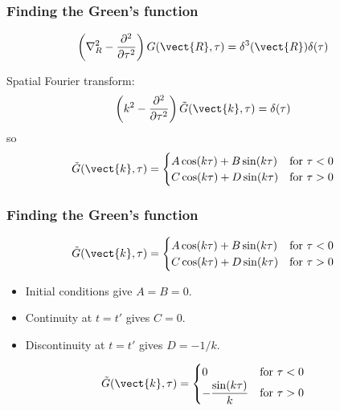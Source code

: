 \documentclass[12 pt, compress, handout, intlimits]{beamer}
\newcommand{\ft}[1]{\tilde{#1}}
\begin{document}
\begin{frame}[fragile]
    \frametitle{Finding the Green's function}
    
    \begin{align*}
        \left( \nabla_R^2 - \frac{\partial^2}{\partial \tau^2} \right) G(\vect{R}, \tau) &= \delta^3(\vect{R}) \delta(\tau)
    \end{align*}

    Spatial Fourier transform:
    \begin{align*}
        \left( k^2 - \frac{\partial^2}{\partial \tau^2} \right) \ft{G}(\vect{k}, \tau) &= \delta(\tau)
    \end{align*}
    so
    \begin{align*}
        \ft{G}(\vect{k},\tau) &= 
        \begin{cases}
            A \cos(k \tau) + B\sin(k \tau) & \text{for } \tau < 0
            \\
            C \cos(k \tau) + D\sin(k \tau) & \text{for } \tau > 0
        \end{cases}
    \end{align*}
    
\end{frame}

\note{}

\begin{frame}[fragile]
    \frametitle{Finding the Green's function}

    
    \vspace{-16pt}
    \begin{align*}
        \ft{G}(\vect{k},\tau) &= 
        \begin{cases}
            A \cos(k \tau) + B\sin(k \tau) & \text{for } \tau < 0
            \\
            C \cos(k \tau) + D\sin(k \tau) & \text{for } \tau > 0
        \end{cases}
    \end{align*}
    
    \begin{itemize}
    \item
        Initial conditions give $ A = B = 0 $.
    \item
        Continuity at $ t = t' $ gives $ C = 0 $.
    \item
        Discontinuity at $ t = t' $ gives $ D = -1/k $.
    \end{itemize}

    \begin{align*}
        \ft{G}(\vect{k},\tau) &= %
        \begin{cases}
            0 & \text{for } \tau < 0
            \\
            -\dfrac{\sin(k \tau)}{k} & \text{for } \tau > 0
        \end{cases}
    \end{align*}

\end{frame}
\end{document}
